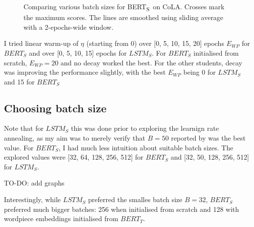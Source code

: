 \documentclass[bsc,frontabs,twoside,singlespacing,parskip,deptreport]{infthesis}
\def\BERTS{BERT\textsubscript{S}}
\def\sliding{The lines are smoothed using sliding average with a 2-epochs-wide window.}
\begin{document}
{{{      \begin{figure}[h!t]
        \centering
        \caption{Comparing various batch sizes for \BERTS~on CoLA. Crosses mark the maximum scores. \sliding}
        \label{fig:exploration-B-bert}
      \end{figure}

      I tried linear warm-up of $\eta$ (starting from 0) over [0, 5, 10, 15, 20] epochs $E_{WP}$ for $BERT_S$ and over [0, 5, 10, 15] epochs for $LSTM_S$.
      For $BERT_S$ initialised from scratch, $E_{WP}=20$ and no decay worked the best. For the other students, decay was improving the performance slightly, with the best $E_{WP}$ being 0 for $LSTM_S$ and 15 for $BERT_S$
    }

    \subsection{Choosing batch size}{
      Note that for $LSTM_S$ this was done prior to exploring the learnign rate annealing, as my aim was to merely verify that $B=50$ reported by \citet{Tang_2019b} was the best value. For $BERT_S$, I had much less intuition about suitable batch sizes. The explored values were [32, 64, 128, 256, 512] for $BERT_S$ and [32, 50, 128, 256, 512] for $LSTM_S$.

      TO-DO: add graphs

      Interestingly, while $LSTM_S$ preferred the smalles batch size $B=32$, $BERT_S$ preferred much bigger batches: 256 when initialised from scratch and 128 with wordpiece embeddings initialised from $BERT_T$.
    }

}}
\end{document}
